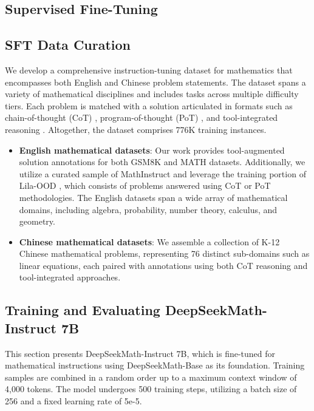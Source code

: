 \begin{itemize}[topsep=0pt]
\section{Supervised Fine-Tuning}

\subsection{SFT Data Curation}

We develop a comprehensive instruction-tuning dataset for mathematics that encompasses both English and Chinese problem statements. The dataset spans a variety of mathematical disciplines and includes tasks across multiple difficulty tiers. Each problem is matched with a solution articulated in formats such as chain-of-thought (CoT) \citep{cot}, program-of-thought (PoT) \citep{pot,pal}, and tool-integrated reasoning \citep{tora}. Altogether, the dataset comprises 776K training instances.

\begin{itemize}[topsep=0pt]
    \item \textbf{English mathematical datasets}: Our work provides tool-augmented solution annotations for both GSM8K and MATH datasets. Additionally, we utilize a curated sample of MathInstruct \citep{MathInstruct} and leverage the training portion of Lila-OOD \citep{lila}, which consists of problems answered using CoT or PoT methodologies. The English datasets span a wide array of mathematical domains, including algebra, probability, number theory, calculus, and geometry.
    \item \textbf{Chinese mathematical datasets}: We assemble a collection of K-12 Chinese mathematical problems, representing 76 distinct sub-domains such as linear equations, each paired with annotations using both CoT reasoning and tool-integrated approaches.
\end{itemize}

\subsection{Training and Evaluating DeepSeekMath-Instruct 7B}

This section presents DeepSeekMath-Instruct 7B, which is fine-tuned for mathematical instructions using DeepSeekMath-Base as its foundation. Training samples are combined in a random order up to a maximum context window of 4,000 tokens. The model undergoes 500 training steps, utilizing a batch size of 256 and a fixed learning rate of 5e-5.


\end{itemize}
